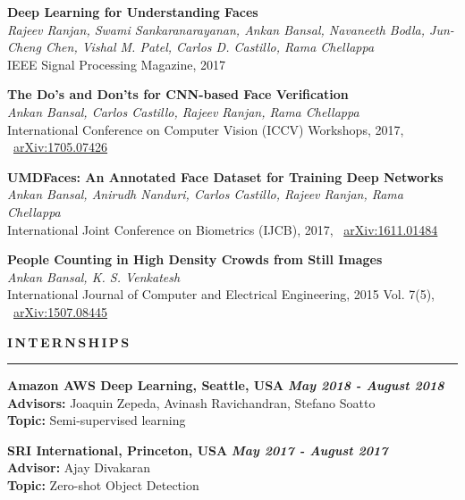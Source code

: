 \documentclass[11pt, a4paper]{article}
\begin{document}
\vspace{4pt}

\textbf{Deep Learning for Understanding Faces} \\
\textit{Rajeev Ranjan, Swami Sankaranarayanan, Ankan Bansal, Navaneeth Bodla, Jun-Cheng Chen, Vishal
M. Patel,  Carlos D. Castillo, Rama Chellappa}\\
IEEE Signal Processing Magazine, 2017

\vspace{4pt}

\textbf{The Do's and Don'ts for CNN-based Face Verification} \\
\textit{Ankan Bansal, Carlos Castillo, Rajeev Ranjan, Rama Chellappa}\\
International Conference on Computer Vision (ICCV) Workshops, 2017, ~\href{https://arxiv.org/abs/1705.07426}{arXiv:1705.07426}

\vspace{4pt}

\textbf{UMDFaces: An Annotated Face Dataset for Training Deep Networks} \\
\textit{Ankan Bansal, Anirudh Nanduri, Carlos Castillo, Rajeev Ranjan, Rama Chellappa}\\
International Joint Conference on Biometrics (IJCB), 2017, ~\href{https://arxiv.org/abs/1611.01484}{arXiv:1611.01484}

\vspace{4pt}

\textbf{People Counting in High Density Crowds from Still Images} \\
\textit{Ankan Bansal, K. S. Venkatesh}\\
International Journal of Computer and Electrical Engineering, 2015 Vol. 7(5), ~\href{https://arxiv.org/abs/1507.08445}{arXiv:1507.08445}

\vspace{8pt}

\textbf{I\,N\,T\,E\,R\,N\,S\,H\,I\,P\,S}
\vspace{5pt}
\hrule
\vspace{7pt}
\textbf{Amazon AWS Deep Learning, Seattle, USA} \hfill \textit{\textbf{May 2018 - August 2018}} \\
\textbf{Advisors: }Joaquin Zepeda, Avinash Ravichandran, Stefano Soatto \\
\textbf{Topic: }Semi-supervised learning

\vspace{4pt}

\textbf{SRI International, Princeton, USA} \hfill \textit{\textbf{May 2017 - August 2017}} \\
\textbf{Advisor: }Ajay Divakaran \\
\textbf{Topic: }Zero-shot Object Detection
\end{document}

